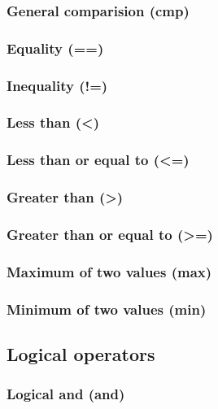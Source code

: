 \documentclass{article}
\theoremstyle{definition}
\begin{document}
\subsubsection{General comparision (cmp)}

\subsubsection{Equality (==)}
\libfcn{==}

\subsubsection{Inequality (!=)}
\libfcn{!=}

\subsubsection{Less than (<)}
\libfcn{<}

\subsubsection{Less than or equal to (<=)}
\libfcn{<=}

\subsubsection{Greater than (>)}
\libfcn{>}

\subsubsection{Greater than or equal to (>=)}
\libfcn{>=}

\subsubsection{Maximum of two values (max)}

\subsubsection{Minimum of two values (min)}

\subsection{Logical operators}

\subsubsection{Logical and (and)}
\end{document}
